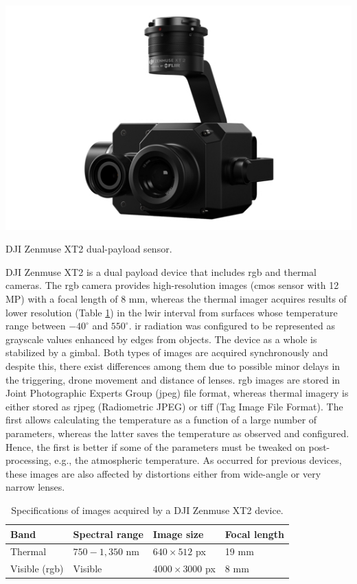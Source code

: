 \begin{marginfigure}[.1cm]
	\includegraphics{figs/materials/zenmuse_xt2.png}
	\caption{DJI Zenmuse XT2 dual-payload sensor.}
	\label{fig:zenmuse_xt2}
\end{marginfigure}
DJI Zenmuse XT2 is a dual payload device that includes \acrshort{rgb} and thermal cameras. The \acrshort{rgb} camera provides high-resolution images (\acrshort{cmos} sensor with 12 MP) with a focal length of 8 \si{\milli\meter}, whereas the thermal imager acquires results of lower resolution (Table \ref{table:zenmuse_xt2}) in the \acrshort{lwir} interval from surfaces whose temperature range between $-40^\circ$ and $550^\circ$. \acrshort{ir} radiation was configured to be represented as grayscale values enhanced by edges from objects. The device as a whole is stabilized by a gimbal. Both types of images are acquired synchronously and despite this, there exist differences among them due to possible minor delays in the triggering, drone movement and distance of lenses. \acrshort{rgb} images are stored in Joint Photographic Experts Group (\acrshort{jpeg}) file format, whereas thermal imagery is either stored as \acrshort{rjpeg} (Radiometric JPEG) or \acrshort{tiff} (Tag Image File Format). The first allows calculating the temperature as a function of a large number of parameters, whereas the latter saves the temperature as observed and configured. Hence, the first is better if some of the parameters must be tweaked on post-processing, e.g., the atmospheric temperature. As occurred for previous devices, these images are also affected by distortions either from wide-angle or very narrow lenses.

\renewcommand{\arraystretch}{1.2}
\begin{table}[ht]
    \caption{Specifications of images acquired by a DJI Zenmuse XT2 device.}
    \label{table:zenmuse_xt2}
    \begin{tabular}{llll}
        \toprule
        Band & Spectral range & Image size & Focal length\\
        \midrule
        Thermal & $750-1,350$ \si{\nano\meter} & $640 \times 512$ px & 19 \si{\milli\meter}\\
        Visible (\acrshort{rgb}) & Visible & $4000 \times 3000$ px & 8 \si{\milli\meter}\\
        \bottomrule
    \end{tabular}
\end{table}
\renewcommand{\arraystretch}{1}

